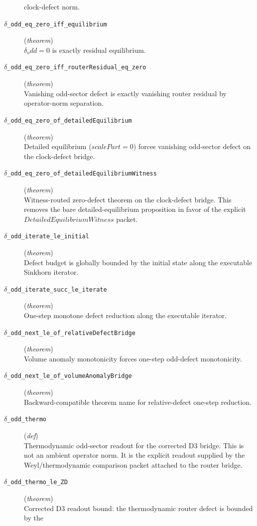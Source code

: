 \documentclass[11pt,a4paper]{article}
\begin{document}
\begin{description}
clock-defect norm.
  \item[\texttt{$\delta $\_odd\_eq\_zero\_iff\_equilibrium}] (\textit{theorem}) \\ $\delta _odd = 0$ is exactly residual equilibrium.
  \item[\texttt{$\delta $\_odd\_eq\_zero\_iff\_routerResidual\_eq\_zero}] (\textit{theorem}) \\ Vanishing odd-sector defect is exactly vanishing router residual by operator-norm separation.
  \item[\texttt{$\delta $\_odd\_eq\_zero\_of\_detailedEquilibrium}] (\textit{theorem}) \\ Detailed equilibrium ($scalePart = 0$) forces vanishing odd-sector defect on 
the clock-defect bridge.
  \item[\texttt{$\delta $\_odd\_eq\_zero\_of\_detailedEquilibriumWitness}] (\textit{theorem}) \\ Witness-routed zero-defect theorem on the clock-defect bridge. 
This removes the bare detailed-equilibrium proposition in favor of the explicit 
$DetailedEquilibriumWitness$ packet.
  \item[\texttt{$\delta $\_odd\_iterate\_le\_initial}] (\textit{theorem}) \\ Defect budget is globally bounded by the initial state along the executable 
Sinkhorn iterator.
  \item[\texttt{$\delta $\_odd\_iterate\_succ\_le\_iterate}] (\textit{theorem}) \\ One-step monotone defect reduction along the executable iterator.
  \item[\texttt{$\delta $\_odd\_next\_le\_of\_relativeDefectBridge}] (\textit{theorem}) \\ Volume anomaly monotonicity forces one-step odd-defect monotonicity.
  \item[\texttt{$\delta $\_odd\_next\_le\_of\_volumeAnomalyBridge}] (\textit{theorem}) \\ Backward-compatible theorem name for relative-defect one-step reduction.
  \item[\texttt{$\delta $\_odd\_thermo}] (\textit{def}) \\ Thermodynamic odd-sector readout for the corrected D3 bridge. 
This is not an ambient operator norm. It is the explicit readout supplied by 
the Weyl/thermodynamic comparison packet attached to the router bridge.
  \item[\texttt{$\delta $\_odd\_thermo\_le\_ZD}] (\textit{theorem}) \\ Corrected D3 readout bound: the thermodynamic router defect is bounded by the 

\end{description}
\end{document}
